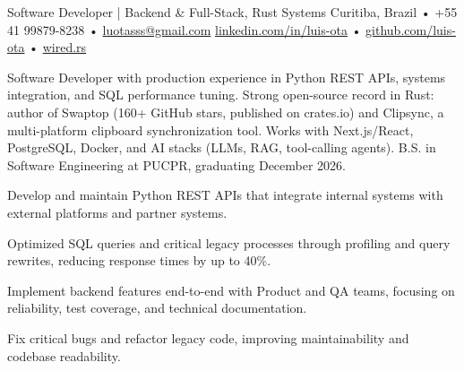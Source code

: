 




\cvheader
  {Software Developer | Backend \& Full-Stack, Rust Systems}
  {Curitiba, Brazil • +55 41 99879-8238 • \href{mailto:luotasss@gmail.com}{luotasss@gmail.com}}
  {\href{https://linkedin.com/in/luis-ota}{linkedin.com/in/luis-ota} • \href{https://github.com/luis-ota}{github.com/luis-ota} • \href{https://wired.rs}{wired.rs}}

Software Developer with production experience in Python REST APIs, systems integration, and SQL performance tuning. Strong open-source record in Rust: author of Swaptop (160+ GitHub stars, published on crates.io) and Clipsync, a multi-platform clipboard synchronization tool. Works with Next.js/React, PostgreSQL, Docker, and AI stacks (LLMs, RAG, tool-calling agents). B.S. in Software Engineering at PUCPR, graduating December 2026.



\begin{cvbullets}
  \item Develop and maintain Python REST APIs that integrate internal systems with external platforms and partner systems.
  \item Optimized SQL queries and critical legacy processes through profiling and query rewrites, reducing response times by up to 40\%.
  \item Implement backend features end-to-end with Product and QA teams, focusing on reliability, test coverage, and technical documentation.
  \item Fix critical bugs and refactor legacy code, improving maintainability and codebase readability.
\end{cvbullets}

